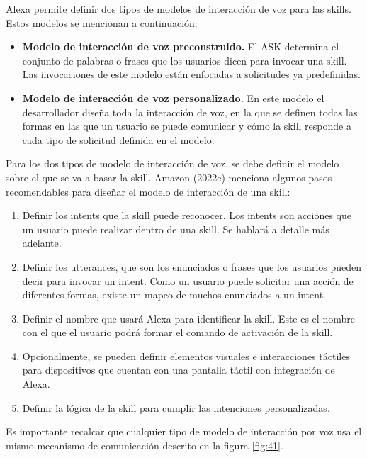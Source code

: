 Alexa permite definir dos tipos de modelos de interacción de voz para las skills. Estos modelos se mencionan a continuación:

\begin{itemize}
  \item \textbf{Modelo de interacción de voz preconstruido.} El ASK determina el conjunto de palabras o frases que los usuarios dicen para invocar una skill. Las invocaciones de este modelo están enfocadas a solicitudes ya predefinidas.
  \item \textbf{Modelo de interacción de voz personalizado.} En este modelo el desarrollador diseña toda la interacción de voz, en la que se definen todas las formas en las que un usuario se puede comunicar y cómo la skill responde a cada tipo de solicitud definida en el modelo.
\end{itemize}

Para los dos tipos de modelo de interacción de voz, se debe definir el modelo sobre el que se va a basar la skill. Amazon (2022e) menciona algunos pasos recomendables para diseñar el modelo de interacción de una skill:

\begin{enumerate}
  \item Definir los intents que la skill puede reconocer. Los intents son acciones que un usuario puede realizar dentro de una skill. Se hablará a detalle más adelante.
  \item Definir los utterances, que son los enunciados o frases que los usuarios pueden decir para invocar un intent. Como un usuario puede solicitar una acción de diferentes formas, existe un mapeo de muchos enunciados a un intent.
  \item Definir el nombre que usará Alexa para identificar la skill. Este es el nombre con el que el usuario podrá formar el comando de activación de la skill.
  \item Opcionalmente, se pueden definir elementos visuales e interacciones táctiles para dispositivos que cuentan con una pantalla táctil con integración de Alexa.
  \item Definir la lógica de la skill para cumplir las intenciones personalizadas.
\end{enumerate}

Es importante recalcar que cualquier tipo de modelo de interacción por voz usa el mismo mecanismo de comunicación descrito en la figura \ref{fig:41}.


